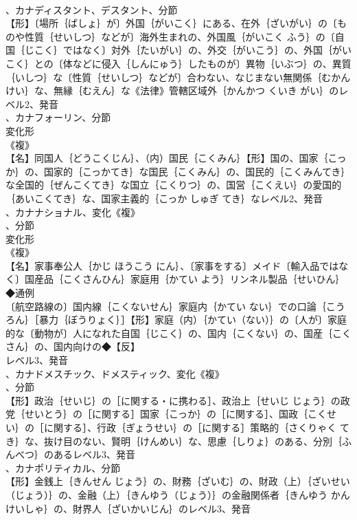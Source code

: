 \documentclass[8pt]{extreport}
\begin{document}
\begin{CJK}{UTF8}{min}
\\	、カナディスタント、デスタント、分節
\\	【形】〔場所｛ばしょ｝が〕外国｛がいこく｝にある、在外｛ざいがい｝の〔ものや性質｛せいしつ｝などが〕海外生まれの、外国風｛がいこく ふう｝の〔自国｛じこく｝ではなく〕対外｛たいがい｝の、外交｛がいこう｝の、外国｛がいこく｝との〔体などに侵入｛しんにゅう｝したものが〕異物｛いぶつ｝の、異質｛いしつ｝な〔性質｛せいしつ｝などが〕合わない、なじまない無関係｛むかんけい｝な、無縁｛むえん｝な《法律》管轄区域外｛かんかつ くいき がい｝のレベル2、発音
\\	、カナフォーリン、分節
\\	変化形 
\\	《複》
\\	【名】同国人｛どうこくじん｝、（内）国民｛こくみん｝【形】国の、国家｛こっか｝の、国家的｛こっかてき｝な国民｛こくみん｝の、国民的｛こくみんてき｝な全国的｛ぜんこくてき｝な国立｛こくりつ｝の、国営｛こくえい｝の愛国的｛あいこくてき｝な、国家主義的｛こっか しゅぎ てき｝なレベル2、発音
\\	、カナナショナル、変化《複》
\\	、分節
\\	変化形 
\\	《複》
\\	【名】家事奉公人｛かじ ほうこう にん｝、〔家事をする〕メイド〔輸入品ではなく〕国産品｛こくさんひん｝家庭用｛かてい よう｝リンネル製品｛せいひん｝◆通例
\\	〔航空路線の〕国内線｛こくないせん｝家庭内｛かてい ない｝での口論｛こうろん｝［暴力｛ぼうりょく｝］【形】家庭（内）｛かてい（ない）｝の〔人が〕家庭的な〔動物が〕人になれた自国｛じこく｝の、国内｛こくない｝の、国産｛こくさん｝の、国内向けの◆【反】
\\	レベル3、発音
\\	、カナドメスチック、ドメスティック、変化《複》
\\	、分節
\\	【形】政治｛せいじ｝の［に関する・に携わる］、政治上｛せいじ じょう｝の政党｛せいとう｝の［に関する］国家｛こっか｝の［に関する］、国政｛こくせい｝の［に関する］、行政｛ぎょうせい｝の［に関する］策略的｛さくりゃく てき｝な、抜け目のない、賢明｛けんめい｝な、思慮｛しりょ｝のある、分別｛ふんべつ｝のあるレベル3、発音
\\	、カナポリティカル、分節
\\	【形】金銭上｛きんせん じょう｝の、財務｛ざいむ｝の、財政（上）｛ざいせい（じょう）｝の、金融（上）｛きんゆう（じょう）｝の金融関係者｛きんゆう かんけいしゃ｝の、財界人｛ざいかいじん｝のレベル3、発音

\end{CJK}
\end{document}
